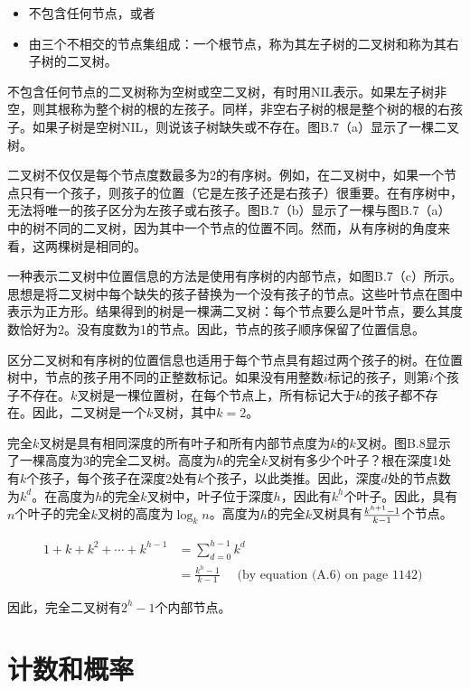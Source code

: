 \documentclass[lang=cn,newtx,10pt,scheme=chinese]{elegantbook}
\begin{document}
\begin{itemize}
\item 不包含任何节点，或者
\item 由三个不相交的节点集组成：一个根节点，称为其左子树的二叉树和称为其右子树的二叉树。
\end{itemize}

不包含任何节点的二叉树称为空树或空二叉树，有时用NIL表示。如果左子树非空，则其根称为整个树的根的左孩子。同样，非空右子树的根是整个树的根的右孩子。如果子树是空树NIL，则说该子树缺失或不存在。图B.7（a）显示了一棵二叉树。

二叉树不仅仅是每个节点度数最多为2的有序树。例如，在二叉树中，如果一个节点只有一个孩子，则孩子的位置（它是左孩子还是右孩子）很重要。在有序树中，无法将唯一的孩子区分为左孩子或右孩子。图B.7（b）显示了一棵与图B.7（a）中的树不同的二叉树，因为其中一个节点的位置不同。然而，从有序树的角度来看，这两棵树是相同的。

一种表示二叉树中位置信息的方法是使用有序树的内部节点，如图B.7（c）所示。思想是将二叉树中每个缺失的孩子替换为一个没有孩子的节点。这些叶节点在图中表示为正方形。结果得到的树是一棵满二叉树：每个节点要么是叶节点，要么其度数恰好为2。没有度数为1的节点。因此，节点的孩子顺序保留了位置信息。

区分二叉树和有序树的位置信息也适用于每个节点具有超过两个孩子的树。在位置树中，节点的孩子用不同的正整数标记。如果没有用整数$i$标记的孩子，则第$i$个孩子不存在。$k$叉树是一棵位置树，在每个节点上，所有标记大于$k$的孩子都不存在。因此，二叉树是一个$k$叉树，其中$k=2$。

完全$k$叉树是具有相同深度的所有叶子和所有内部节点度为$k$的$k$叉树。图B.8显示了一棵高度为3的完全二叉树。高度为$h$的完全$k$叉树有多少个叶子？根在深度1处有$k$个孩子，每个孩子在深度2处有$k$个孩子，以此类推。因此，深度$d$处的节点数为$k^d$。在高度为$h$的完全$k$叉树中，叶子位于深度$h$，因此有$k^h$个叶子。因此，具有$n$个叶子的完全$k$叉树的高度为$\log_k n$。高度为$h$的完全$k$叉树具有$k^{h+1}-1\over k-1$个节点。

$$
\begin{aligned}
1+k+k^2+\cdots+k^{h-1} & =\sum_{d=0}^{h-1} k^d \\
& =\frac{k^h-1}{k-1} \quad \text { (by equation (A.6) on page 1142) }
\end{aligned}
$$

因此，完全二叉树有$2^h-1$个内部节点。

\chapter{计数和概率}
\end{document}
